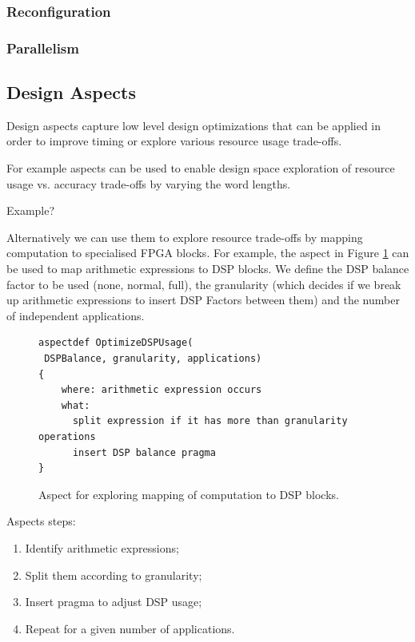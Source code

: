\subsubsection{\TODO Reconfiguration}


\subsubsection{\TODO Parallelism}

\subsection{Design Aspects}

Design aspects capture low level design optimizations that can be
applied in order to improve timing or explore various resource usage
trade-offs.

For example aspects can be used to enable design space exploration of
resource usage vs. accuracy trade-offs by varying the word lengths.

\TODO Example?

Alternatively we can use them to explore resource trade-offs by
mapping computation to specialised FPGA blocks. For example, the
aspect in Figure \ref{fig:aspect-DSP} can be used to map arithmetic
expressions to DSP blocks. We define the DSP balance factor to be used
(none, normal, full), the granularity (which decides if we break up
arithmetic expressions to insert DSP Factors between them) and the
number of independent applications.

\lstset{style=aspectp}
\begin{figure}[!h]
\centering
\begin{lstlisting}
aspectdef OptimizeDSPUsage(
 DSPBalance, granularity, applications)
{
    where: arithmetic expression occurs
    what:
      split expression if it has more than granularity operations
      insert DSP balance pragma
}
\end{lstlisting}
\caption{Aspect for exploring mapping of computation to DSP blocks.}
\label{fig:aspect-DSP}
\end{figure}

Aspects steps:

\begin{enumerate}
\item Identify arithmetic expressions;
\item Split them according to granularity;
\item Insert pragma to adjust DSP usage;
\item Repeat for a given number of applications.
\end{enumerate}

